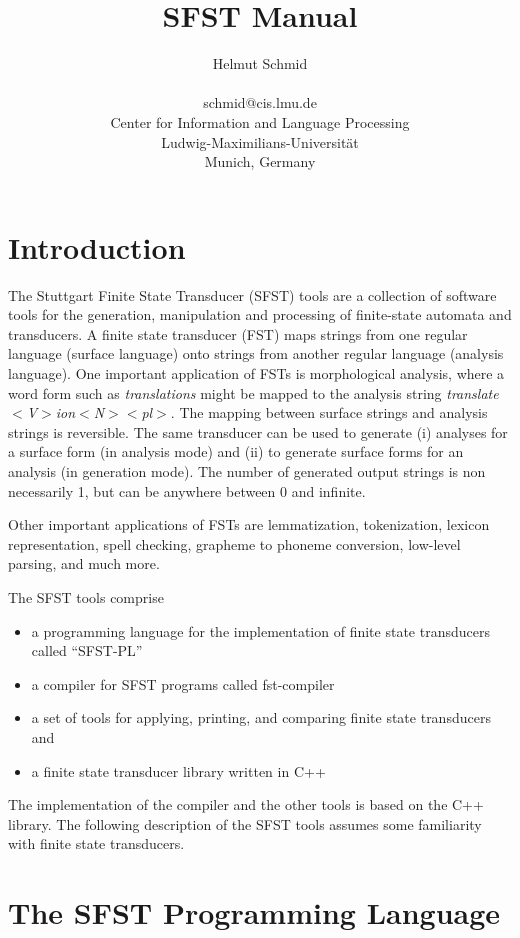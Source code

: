 \documentclass{article}
\title{SFST Manual}
\author{Helmut Schmid\\\\schmid@cis.lmu.de\\
  Center for Information and Language Processing\\
  Ludwig-Maximilians-Universit{\"a}t\\Munich, Germany}
\date{}
\begin{document}
\maketitle


\section{Introduction}

The Stuttgart Finite State Transducer (SFST) tools are a collection of
software tools for the generation, manipulation and processing of
finite-state automata and transducers. A finite state transducer (FST)
maps strings from one regular language (surface language) onto strings
from another regular language (analysis language). One important
application of FSTs is morphological analysis, where a word form such
as \emph{translations} might be mapped to the analysis string
\emph{translate$<$V$>$ion$<$N$>$$<$pl$>$}. The mapping between surface
strings and analysis strings is reversible. The same transducer can be
used to generate (i) analyses for a surface form (in analysis mode)
and (ii) to generate surface forms for an analysis (in generation
mode). The number of generated output strings is non necessarily 1,
but can be anywhere between 0 and infinite.

Other important applications of FSTs are lemmatization, tokenization,
lexicon representation, spell checking, grapheme to phoneme
conversion, low-level parsing, and much more.

The SFST tools comprise
\begin{itemize}
\item a programming language for the implementation of finite state
  transducers called ``SFST-PL''
\item a compiler for SFST programs called fst-compiler
\item a set of tools for applying, printing, and comparing finite
  state transducers and
\item a finite state transducer library written in C++
\end{itemize}

The implementation of the compiler and the other tools is based on the
C++ library. The following description of the SFST tools assumes some
familiarity with finite state transducers.

\section{The SFST Programming Language}
\end{document}
